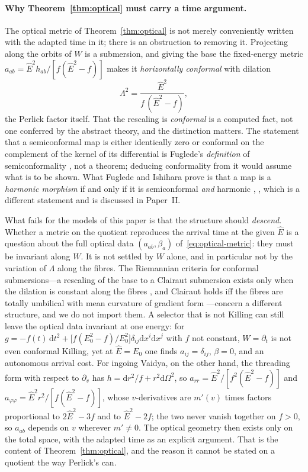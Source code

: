 \documentclass[12pt]{iopart}
\newcommand{\Ehat}{\hat E}
\newcommand{\dd}{\mathrm{d}}
\theoremstyle{plain}
\theoremstyle{definition}
\theoremstyle{plain}
\theoremstyle{remark}
\begin{document}
\paragraph{Why Theorem~\ref{thm:optical} must carry a time argument.} The optical
metric of Theorem~\ref{thm:optical} is not merely conveniently written with the
adapted time in it; there is an obstruction to removing it. Projecting along the
orbits of $W$ is a submersion, and giving the base the fixed-energy metric
$a_{ab}=\Ehat^2h_{ab}/[f(\Ehat^2-f)]$ makes it \emph{horizontally conformal} with
dilation
\begin{equation}
    \Lambda^2=\frac{\Ehat^2}{f\,(\Ehat^2-f)},
    \label{eq:dilation-p1}
\end{equation}
the Perlick factor itself. That the rescaling is \emph{conformal} is a computed
fact, not one conferred by the abstract theory, and the distinction matters. The
statement that a semiconformal map is either identically zero or conformal on the
complement of the kernel of its differential is Fuglede's \emph{definition} of
semiconformality \cite[\S5]{Fuglede1978}, not a theorem; deducing conformality from
it would assume what is to be shown. What Fuglede and Ishihara prove is that a map
is a \emph{harmonic morphism} if and only if it is semiconformal \emph{and}
harmonic \cite[\S7]{Fuglede1978}, \cite{Ishihara1979,BairdWood2003}, which is a
different statement and is discussed in Paper~II.

What fails for the models of this paper is that the structure should \emph{descend}.
Whether a metric on the quotient reproduces the arrival time at the given $\Ehat$ is a
question about the full optical data $(a_{ab},\beta_a)$ of~\eqref{eq:optical-metric}:
they must be invariant along $W$. It is not settled by $W$ alone, and in particular not by
the variation of $\Lambda$ along the fibres. The Riemannian criteria for conformal
submersions---a rescaling of the base to a Clairaut submersion exists only when the
dilation is constant along the fibres \cite{MeenaZawadzki2024}, and Clairaut holds iff
the fibres are totally umbilical with mean curvature of gradient form
\cite{Bishop1972}---concern a different structure, and we do not import them. A
selector that is not Killing can still leave the optical data invariant at one energy:
for $g=-f(t)\,\dd t^2+\big[f(E_0^2-f)/E_0^2\big]\delta_{ij}\dd x^i\dd x^j$ with $f$ not
constant, $W=\partial_t$ is not even conformal Killing, yet at $\Ehat=E_0$ one finds
$a_{ij}=\delta_{ij}$, $\beta=0$, and an autonomous arrival cost. For ingoing Vaidya, on
the other hand, the threading form with respect to $\partial_v$ has
$h=\dd r^2/f+r^2\dd\Omega^2$, so $a_{rr}=\Ehat^2/[f^2(\Ehat^2-f)]$ and
$a_{\varphi\varphi}=\Ehat^2r^2/[f(\Ehat^2-f)]$, whose $v$-derivatives are $m'(v)$ times
factors proportional to $2\Ehat^2-3f$ and to $\Ehat^2-2f$; the two never vanish together
on $f>0$, so $a_{ab}$ depends on $v$ wherever $m'\neq0$. The optical geometry then exists
only on the total space, with the adapted time as an explicit argument. That is the
content of Theorem~\ref{thm:optical}, and the reason it cannot be stated on a quotient the
way Perlick's can.
\end{document}
